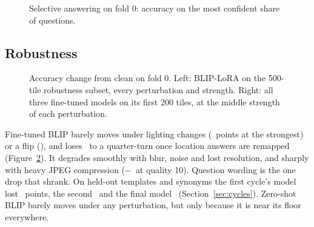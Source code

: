 \documentclass[10pt,twocolumn]{article}
\begin{document}
\begin{figure}[t]\centering
{}
\caption{Selective answering on fold 0: accuracy on the most confident share of questions.}\label{fig:rc}
\end{figure}

\subsection{Robustness}\label{sec:robust}
\begin{figure}[t]\centering
{}
\caption{Accuracy change from clean on fold 0. Left: BLIP-LoRA on the 500-tile robustness subset, every perturbation and strength. Right: all three fine-tuned models on its first 200 tiles, at the middle strength of each perturbation.}\label{fig:robust}
\end{figure}
Fine-tuned BLIP barely moves under lighting changes (\blipLightDrop\ points at the strongest) or a flip (\blipFlipDrop), and loses \blipRotDrop\ to a quarter-turn once location answers are remapped (Figure~\ref{fig:robust}). It degrades smoothly with blur, noise and lost resolution, and sharply with heavy JPEG compression ($-$\blipJpegDrop\ at quality 10). Question wording is the one drop that shrank. On held-out templates and synonyms the first cycle's model lost \voneParaphraseDrop\ points, the second \vtwoParaphraseDrop\ and the final model \blipParaphraseDrop\ (Section~\ref{sec:cycles}). Zero-shot BLIP barely moves under any perturbation, but only because it is near its floor everywhere.
\end{document}
